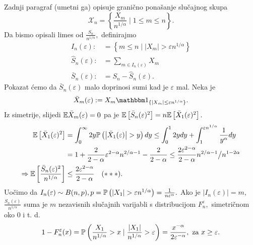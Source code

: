 \documentclass{article}
\begin{document}
Zadnji paragraf (umetni ga) opisuje granično ponašanje slučajnog skupa \[\mathcal X_n=\left\{\frac{X_m}{n^{1/\alpha}}\mid1\le m\le n\right\}.\] Da bismo opisali limes od \(\frac{S_n}{n^{1/\alpha}},\) definirajmo \[\begin{aligned}I_n(\varepsilon):&=\left\{m\le n\mid|X_m|>\varepsilon n^{1/\alpha}\right\}\\\hat S_n(\varepsilon):&=\sum_{m\in I_n(\varepsilon)}X_m\\\bar S_n(\varepsilon):&=S_n-\hat S_n(\varepsilon).\end{aligned}\] Pokazat ćemo da \(\bar S_n(\varepsilon)\) malo doprinosi sumi kad je \(\varepsilon\) mal. Neka je  \[\bar X_m(\varepsilon):=X_m\mathbbm 1_{\{|X_m|\le\varepsilon n^{1/\alpha}\}}.\] Iz simetrije, slijedi \(\Bbb E\bar X_m(\varepsilon)=0\) pa je \(\Bbb E\left[\bar S_n(\varepsilon)^2\right]=n\Bbb E\left[\bar X_1(\varepsilon)^2\right].\) \[\begin{aligned}\Bbb E\left[\bar X_1(\varepsilon)^2\right]&=\int_0^\infty2y\Bbb P\left(\left|\bar X_1(\varepsilon)\right|>y\right)dy\le\int_0^1 2ydy+\int_1^{\varepsilon n^{1/\alpha}}\frac1{y^\alpha}dy\\&=1+\frac2{2-\alpha}\varepsilon^{2-\alpha}n^{2/\alpha-1}-\frac2{2-\alpha}\le\frac{2\varepsilon^{2-\alpha}}{2-\alpha}n^{2/\alpha-1}\big/n^{1-2\alpha}\\\Rightarrow\Bbb E\left[\frac{\bar S_n(\varepsilon)^2}{n^{1/\alpha}}\right]&\le\frac{2\varepsilon^{2-\alpha}}{2-\alpha}\quad(\ast\ast\ast).\end{aligned}\] Uočimo da \(I_n(\varepsilon)\sim B(n,p),p=\Bbb P\left(|X_1|>\varepsilon n^{1/\alpha}\right)=\frac1{n\varepsilon^\alpha}.\) Ako je \(|I_n(\varepsilon)|=m,\) \(\frac{\hat S_n(\varepsilon)}{n^{1/\alpha}}\) suma je \(m\) nezavisnih slučajnih varijabli s distribucijom \(F_n^\varepsilon,\) simetričnom oko \(0\) i t. d.\[1-F_n^\varepsilon(x)=\Bbb P\left(\frac{X_1}{n^{1/\alpha}}>x\mid\frac{|X_1|}{n^{1/\alpha}}>\varepsilon\right)=\frac{x^{-\alpha}}{2\varepsilon^{-\alpha}},\text{ za }x\ge\varepsilon.\] 
\end{document}

